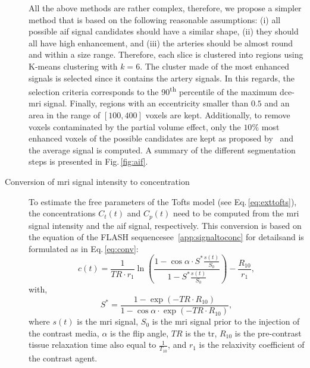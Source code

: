 \begin{description}
    All the above methods are rather complex, therefore,  we propose a simpler method that is based on the following reasonable assumptions:
    (i) all possible \ac{aif} signal candidates should have a similar shape,
    (ii) they should all have high enhancement, and
    (iii) the arteries should be almost round and within a size range.
    Therefore, each slice is clustered into regions using K-means clustering with $k=6$.
    The cluster made of the most enhanced signals is selected since it contains the artery signals.
    In this regards, the selection criteria corresponds to the 90\textsuperscript{th} percentile of the maximum \ac{dce}-\ac{mri} signal.
    Finally, regions with an eccentricity smaller than $0.5$ and an area in the range of $[100, 400]$ voxels are kept.
    Additionally, to remove voxels contaminated by the partial volume effect, only the $10\%$ most enhanced voxels of the possible candidates are kept as proposed by~\cite{schabel2008uncertainty} and the average signal is computed.
    A summary of the different segmentation steps is presented in Fig.\,\ref{fig:aif}.
    \item[Conversion of \ac{mri} signal intensity to concentration] To estimate the free parameters of the Tofts model (see Eq.\,\eqref{eq:exttofts}), the concentrations $C_t(t)$ and $C_p(t)$ need to be computed from the \ac{mri} signal intensity and the \ac{aif} signal, respectively.
      This conversion is based on the equation of the FLASH sequence\textemdash see~\ref{app:signaltoconc} for details\textemdash and is formulated as in Eq.\,\eqref{eq:conv}:
      \begin{equation}
        c(t) = \frac{1}{TR \cdot r_1} \ln\left( \frac{1 - \cos \alpha \cdot S^{*}\frac{s(t)}{S_0}}{1 - S^{*}\frac{s(t)}{S_0}} \right) - \frac{R_{10}}{r_1} ,
        \label{eq:conv}
      \end{equation}
      \noindent with,
      \begin{equation}
        S^{*} = \frac{1 - \exp(- TR \cdot R_{10})}{1 - \cos \alpha \cdot \exp(- TR \cdot R_{10})} ,
        \label{eq:sstarconv}
      \end{equation}
      \noindent where $s(t)$ is the \ac{mri} signal, $S_0$ is the \ac{mri} signal prior to the injection of the contrast media, $\alpha$ is the flip angle, $TR$ is the \acf{tr}, $R_{10}$ is the pre-contrast tissue relaxation time also equal to $\frac{1}{T_{10}}$, and $r_1$ is the relaxivity coefficient of the contrast agent.


\end{description}
